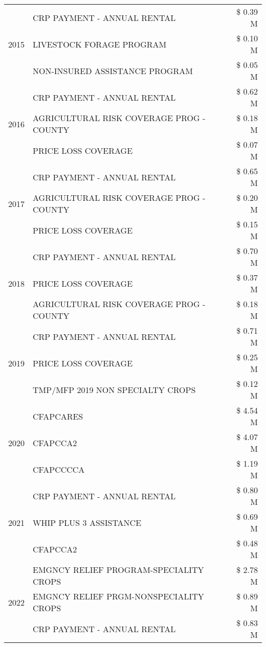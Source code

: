 \begin{tabular}{llr}
\cline{1-3}
\multirow[t]{3}{*}{2015} & CRP PAYMENT - ANNUAL RENTAL & \$ 0.39 M \\
 & LIVESTOCK FORAGE PROGRAM & \$ 0.10 M \\
 & NON-INSURED ASSISTANCE PROGRAM & \$ 0.05 M \\
\cline{1-3}
\multirow[t]{3}{*}{2016} & CRP PAYMENT - ANNUAL RENTAL & \$ 0.62 M \\
 & AGRICULTURAL RISK COVERAGE PROG - COUNTY & \$ 0.18 M \\
 & PRICE LOSS COVERAGE & \$ 0.07 M \\
\cline{1-3}
\multirow[t]{3}{*}{2017} & CRP PAYMENT - ANNUAL RENTAL & \$ 0.65 M \\
 & AGRICULTURAL RISK COVERAGE PROG - COUNTY & \$ 0.20 M \\
 & PRICE LOSS COVERAGE & \$ 0.15 M \\
\cline{1-3}
\multirow[t]{3}{*}{2018} & CRP PAYMENT - ANNUAL RENTAL & \$ 0.70 M \\
 & PRICE LOSS COVERAGE & \$ 0.37 M \\
 & AGRICULTURAL RISK COVERAGE PROG - COUNTY & \$ 0.18 M \\
\cline{1-3}
\multirow[t]{3}{*}{2019} & CRP PAYMENT - ANNUAL RENTAL & \$ 0.71 M \\
 & PRICE LOSS COVERAGE & \$ 0.25 M \\
 & TMP/MFP 2019 NON SPECIALTY CROPS & \$ 0.12 M \\
\cline{1-3}
\multirow[t]{3}{*}{2020} & CFAPCARES & \$ 4.54 M \\
 & CFAPCCA2 & \$ 4.07 M \\
 & CFAPCCCCA & \$ 1.19 M \\
\cline{1-3}
\multirow[t]{3}{*}{2021} & CRP PAYMENT - ANNUAL RENTAL & \$ 0.80 M \\
 & WHIP PLUS 3 ASSISTANCE & \$ 0.69 M \\
 & CFAPCCA2 & \$ 0.48 M \\
\cline{1-3}
\multirow[t]{3}{*}{2022} & EMGNCY RELIEF PROGRAM-SPECIALITY CROPS & \$ 2.78 M \\
 & EMGNCY RELIEF PRGM-NONSPECIALITY CROPS & \$ 0.89 M \\
 & CRP PAYMENT - ANNUAL RENTAL & \$ 0.83 M \\
\cline{1-3}
\bottomrule
\end{tabular}
